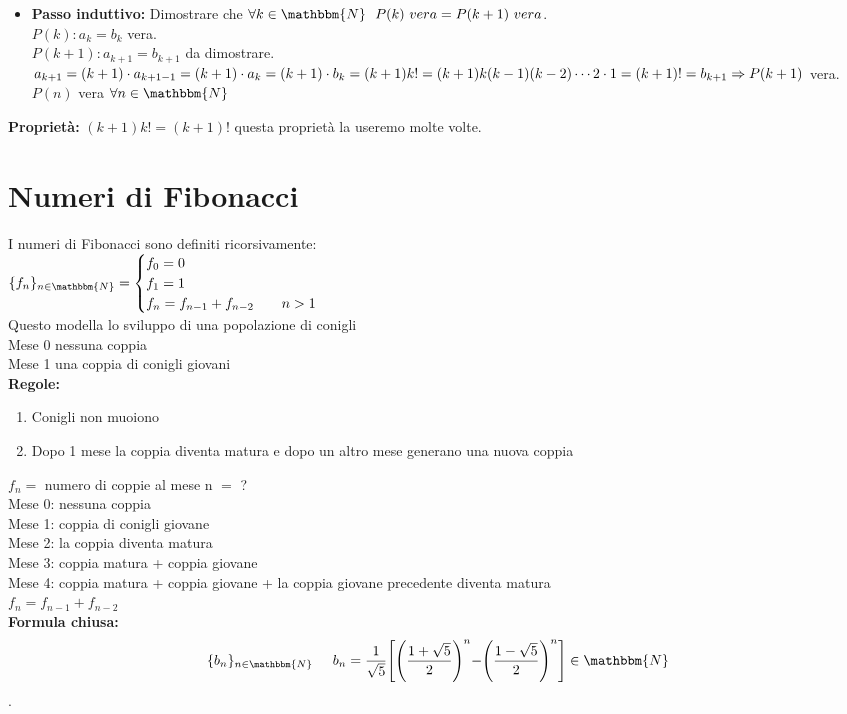 \documentclass[12pt, letterpaper]{report}
\begin{document}
\begin{enumerate}
\begin{itemize}
 				\item \textbf{Passo induttivo:} Dimostrare che $\forall k \in \mathbbm{N} \ \ P(k) \ vera = P(k + 1) \ vera$. \\
 				$P(k): a_k = b_k$ vera. \\
 				$P(k + 1): a_{k + 1} = b_{k + 1}$ da dimostrare.
 				\\
 				$a_{k + 1} = (k + 1) \cdot a_{k + 1 - 1} = (k + 1) \cdot a_k = (k + 1) \cdot b_k = (k + 1)k! = (k + 1)k(k - 1)(k - 2) \cdots 2 \cdot 1 = (k + 1)! = b_{k + 1} \\ \Rightarrow P(k + 1)$ vera. \\
 				$P(n)$ vera $\forall n \in \mathbbm{N}$
 			\end{itemize}
 		\end{enumerate}

 		\textbf{Proprietà:} $(k + 1)k! = (k + 1)!$ questa proprietà la useremo molte volte.
 		\section{Numeri di Fibonacci}
 		I numeri di Fibonacci sono definiti ricorsivamente: \\
 		$\{f_n\}_{n \in \mathbbm{N}} = \begin{cases}
 			f_0 = 0 \\
 			f_1 = 1 \\
 			f_n = f_{n - 1} + f_{n - 2} \hspace{0.7cm} n > 1
 		\end{cases}$ \\
 		Questo modella lo sviluppo di una popolazione di conigli
 		\\
 		Mese 0 nessuna coppia \\
 		Mese 1 una coppia di conigli giovani \\
 		\textbf{Regole:}
 		\begin{enumerate}
 			\item Conigli non muoiono
 			\item Dopo 1 mese la coppia diventa matura e dopo un altro mese generano una nuova coppia
 		\end{enumerate}
 		$f_n = $ numero di coppie al mese n $=$ ?
 		\\
 		Mese 0: nessuna coppia \\
 		Mese 1: coppia di conigli giovane \\
 		Mese 2: la coppia diventa matura \\
 		Mese 3: coppia matura + coppia giovane \\
 		Mese 4: coppia matura + coppia giovane + la coppia giovane precedente diventa matura
 		\\
 		$f_n = f_{n - 1} + f_{n - 2}$ \\
 		\textbf{Formula chiusa:}
 		\\
 		\[
 		\{b_n\}_{n \in \mathbbm{N}} \hspace{0.5cm} b_n = \frac{1}{\sqrt{5}}\Biggr[\Biggl(\frac{1 + \sqrt{5}}{2}\Biggl)^n - \Biggl(\frac{1 - \sqrt{5}}{2}\Biggl)^n\Biggr] \in \mathbbm{N}
 		\].
\end{document}

